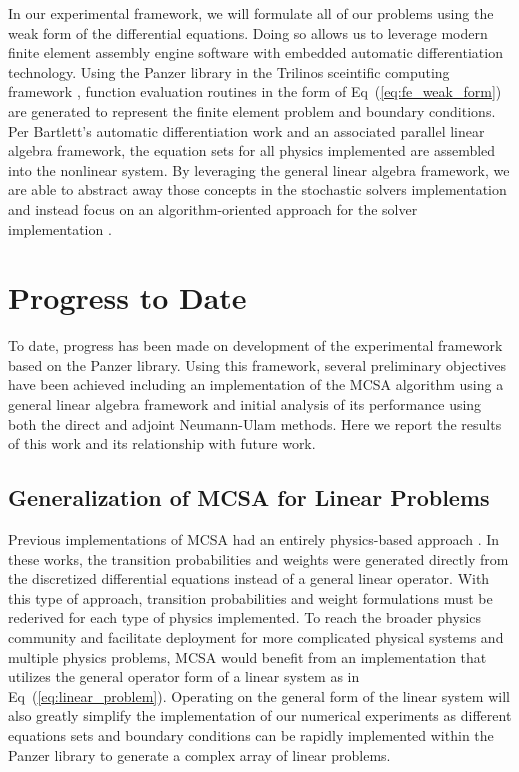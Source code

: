 In our experimental framework, we will formulate all of our problems
using the weak form of the differential equations. Doing so allows us
to leverage modern finite element assembly engine software with
embedded automatic differentiation technology. Using the Panzer
library in the Trilinos sceintific computing framework
\citep{notz_graph-based_2010,heroux_overview_2005}, function
evaluation routines in the form of Eq~(\ref{eq:fe_weak_form}) are
generated to represent the finite element problem and boundary
conditions. Per Bartlett's automatic differentiation work and an
associated parallel linear algebra framework, the equation sets for
all physics implemented are assembled into the nonlinear system. By
leveraging the general linear algebra framework, we are able to
abstract away those concepts in the stochastic solvers implementation
and instead focus on an algorithm-oriented approach for the solver
implementation \citep{musser_algorithm-oriented_1994}.

\section{Progress to Date}
\label{sec:progress}
To date, progress has been made on development of the experimental
framework based on the Panzer library. Using this framework, several
preliminary objectives have been achieved including an implementation
of the MCSA algorithm using a general linear algebra framework and
initial analysis of its performance using both the direct and adjoint
Neumann-Ulam methods. Here we report the results of this work and its
relationship with future work.

\subsection{Generalization of MCSA for Linear Problems}
\label{subsec:mcsa_generalization}
Previous implementations of MCSA had an entirely physics-based
approach \citep{evans_monte_2009,evans_monte_2012}. In these works,
the transition probabilities and weights were generated directly from
the discretized differential equations instead of a general linear
operator. With this type of approach, transition probabilities and
weight formulations must be rederived for each type of physics
implemented. To reach the broader physics community and facilitate
deployment for more complicated physical systems and multiple physics
problems, MCSA would benefit from an implementation that utilizes the
general operator form of a linear system as in
Eq~(\ref{eq:linear_problem}). Operating on the general form of the
linear system will also greatly simplify the implementation of our
numerical experiments as different equations sets and boundary
conditions can be rapidly implemented within the Panzer library to
generate a complex array of linear problems.

